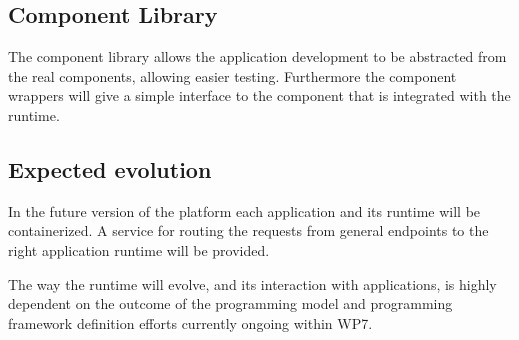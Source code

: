 \subsection{Component Library}

The component library allows the application development to be abstracted from the real components, allowing easier testing. 
Furthermore the component wrappers will give a simple interface to the component that is integrated with the runtime.


\subsection{Expected evolution}

In the future version of the platform each application and its runtime will be containerized. A service for routing the requests from general endpoints to the right application runtime will be provided.

The way the runtime will evolve, and its interaction with applications, is highly dependent on the outcome of the programming model and programming framework definition efforts currently ongoing within WP7.